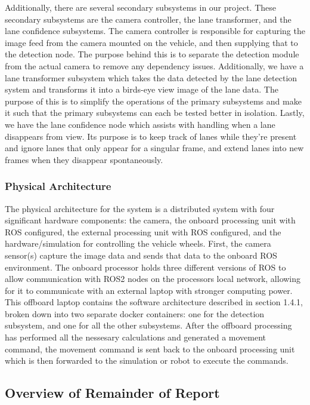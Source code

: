 \documentclass[titlepage,draft]{article}
\begin{document}
Additionally, there are several secondary subsystems in our project. These secondary subsystems are the camera controller, the lane transformer, and the lane confidence subsystems. The camera controller is responsible for capturing the image feed from the camera mounted on the vehicle, and then supplying that to the detection node. The purpose behind this is to separate the detection module from the actual camera to remove any dependency issues. Additionally, we have a lane transformer subsystem which takes the data detected by the lane detection system and transforms it into a birds-eye view image of the lane data. The purpose of this is to simplify the operations of the primary subsystems and make it such that the primary subsystems can each be tested better in isolation. Lastly, we have the lane confidence node which assists with handling when a lane disappears from view. Its purpose is to keep track of lanes while they're present and ignore lanes that only appear for a singular frame, and extend lanes into new frames when they disappear spontaneously.

\subsubsection{Physical Architecture}

The physical architecture for the system is a distributed system with four significant hardware components: the camera, the onboard processing unit with ROS configured, the external processing unit with ROS configured, and the hardware/simulation for controlling the vehicle wheels. First, the camera sensor(s) capture the image data and sends that data to the onboard ROS environment. The onboard processor holds three different versions of ROS to allow communication with ROS2 nodes on the processors local network, allowing for it to communicate with an external laptop with stronger computing power. This offboard laptop contains the software architecture described in section 1.4.1, broken down into two separate docker containers: one for the detection subsystem, and one for all the other subsystems. After the offboard processing has performed all the nessesary calculations and generated a movement command, the movement command is sent back to the onboard processing unit which is then forwarded to the simulation or robot to execute the commands.

\subsection{Overview of Remainder of Report}
\end{document}
